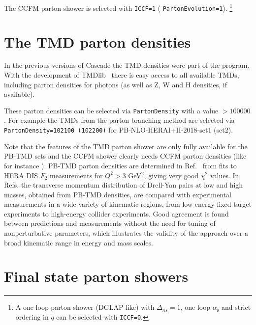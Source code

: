 \documentclass[11pt]{article} \usepackage{mystyle-new}
\newcommand{\as}{\ensuremath{\alpha_\mathrm{s}}}
\def\tmdlib{{\sc TMDlib}}
\def\PB{{PB}}
\newenvironment{tolerant}[1]{\par\tolerance=#1\relax}{ \par }
\begin{document}
The CCFM  parton shower is selected with \verb+ICCF=1+ ( \verb+PartonEvolution=1+). \footnote{A one loop parton shower (DGLAP like) with $\Delta_{ns}=1$, one loop $\as$ and strict ordering in $q$ 
can be selected with \texttt{ICCF=0}.}


\section{The TMD parton densities}

In the previous versions of {\sc Cascade}  the TMD densities were part of the program. With the development of \tmdlib ~\cite{Hautmann:2014kza,Abdulov:2021ivr}  there is easy access to all available TMDs, including parton densities for photons (as well as Z, W and H densities, if available).
 \begin{tolerant}{2000}
These parton densities  can be selected via \verb+PartonDensity+ with a value $>100000$.
For example the TMDs from the parton branching method \cite{Hautmann:2017fcj,Hautmann:2017xtx} are selected via  \verb+PartonDensity=102100 (102200)+ for PB-NLO-HERAI+II-2018-set1 (set2). 
\end{tolerant}

Note that the features of the TMD parton shower are only fully available for the \PB -TMD sets and the CCFM shower clearly needs CCFM parton densities  (like for instance \cite{Hautmann:2013tba}). 
\PB -TMD parton densities are determined in Ref.~\cite{Martinez:2018jxt} from fits to HERA DIS $F_2$ measurements for $Q^2 > 3 $ GeV$^2$, giving very good $\chi^2$ values.
In Refs. \cite{Martinez:2020fzs,Martinez:2019mwt} the transverse momentum distribution of  Drell-Yan pairs at low and high masses, 
obtained from \PB -TMD densities, are compared with experimental measurements in a wide variety of kinematic regions, from low-energy fixed target experiments to high-energy collider experiments. Good agreement is found between predictions and measurements without the need for tuning of nonperturbative parameters, which illustrates the validity of the approach over a broad kinematic range in energy and mass scales.


\section{Final state parton showers}
\end{document}
